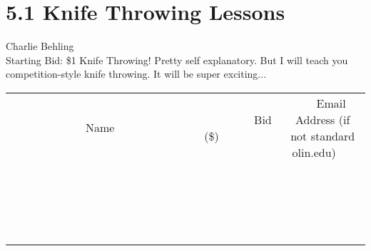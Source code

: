 \documentclass[11pt]{article}
\begin{document}
\section*{5.1 Knife Throwing Lessons}
Charlie Behling
\\
Starting Bid: \$1
\newline
Knife Throwing! Pretty self explanatory. But I will teach you competition-style knife throwing. It will be super exciting...
\\[3ex]
\begin{tabular}{c c c}
~~~~~~~~~~~~~Name~~~~~~~~~~~~~ & ~~~~~~~~~Bid (\$)~~~~~~~~~  & ~~~Email Address (if not standard olin.edu)~~~\\
 & & \\
\hline
 & & \\
\hline
 & & \\
\hline
 & & \\
\hline
 & & \\
\hline
 & & \\
\hline
 & & \\
\hline
 & & \\
\hline
 & & \\
\hline
 & & \\
\hline
 & & \\
\hline
 & & \\
\hline
 & & \\
\hline
 & & \\
\hline
 & & \\
\hline
 & & \\
\hline
 & & \\
\hline
 & & \\
\hline
 & & \\
\hline
\end{tabular}
\newpage
\end{document}
